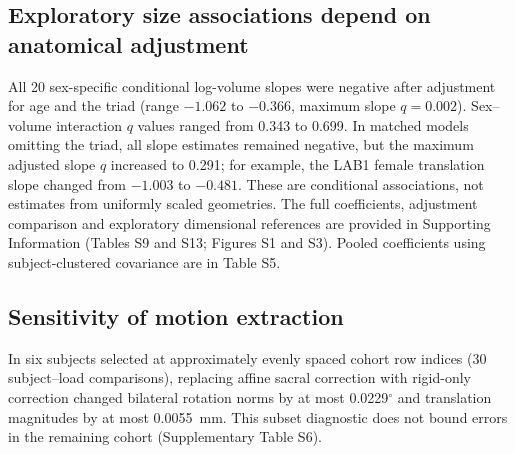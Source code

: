 \subsection{Exploratory size associations depend on anatomical adjustment}
All 20 sex-specific conditional log-volume slopes were negative after adjustment for age and the triad (range $-1.062$ to $-0.366$, maximum slope $q=0.002$). Sex--volume interaction $q$ values ranged from 0.343 to 0.699. In matched models omitting the triad, all slope estimates remained negative, but the maximum adjusted slope $q$ increased to 0.291; for example, the LAB1 female translation slope changed from $-1.003$ to $-0.481$. These are conditional associations, not estimates from uniformly scaled geometries. The full coefficients, adjustment comparison and exploratory dimensional references are provided in Supporting Information (Tables S9 and S13; Figures S1 and S3). Pooled coefficients using subject-clustered covariance are in Table S5.

\subsection{Sensitivity of motion extraction}
In six subjects selected at approximately evenly spaced cohort row indices (30 subject--load comparisons), replacing affine sacral correction with rigid-only correction changed bilateral rotation norms by at most 0.0229$^\circ$ and translation magnitudes by at most 0.0055~mm. This subset diagnostic does not bound errors in the remaining cohort (Supplementary Table S6).

